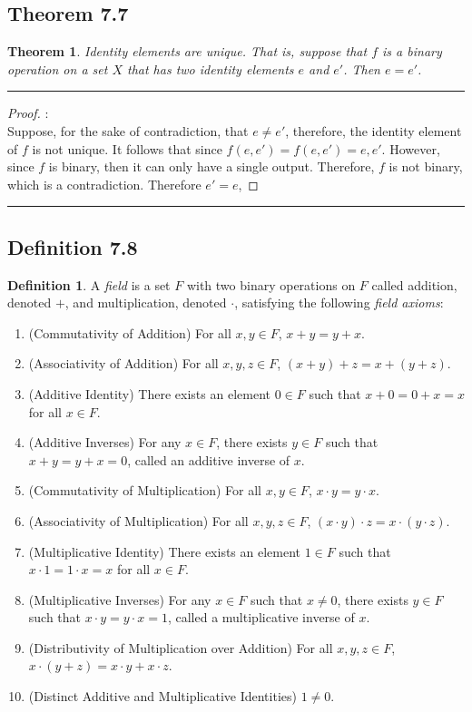 \documentclass[openany, amssymb, psamsfonts]{amsart}
\newtheorem{thm}{Theorem}[section]
\theoremstyle{definition}
\newtheorem{defn}{Definition}[section]
\numberwithin{equation}{section}
\begin{document}
\subsection*{Theorem 7.7}
\label{7.7}
\begin{thm}
Identity elements are unique.  That is, suppose that $f$ is a binary operation on a set $X$ that has two identity elements $e$ and $e'$.  Then $e = e'$.
\end{thm}
        \vspace{4pt}     \hrule   \vspace{4pt} \begin{proof}:\\
Suppose, for the sake of contradiction, that $e \neq e'$, therefore, the identity element of $f$ is not unique. It follows that since $f(e,e') = f(e,e') = e,e'$. However, since $f$ is binary, then it can only have a single output. Therefore, $f$ is not binary, which is a contradiction. Therefore $e' = e$, 
\end{proof}		
\vspace{4pt}     \hrule   \vspace{4pt}
\subsection*{Definition 7.8}
\label{7.8}
\begin{defn}
	A \emph{field} is a set $F$ with two binary operations  on $F$ called addition, denoted $+$, and multiplication, denoted $\cdot$\;, satisfying the following \emph{field axioms}:
	\begin{enumerate}[{FA}1]
		\item  (Commutativity of Addition)  For all $x,y\in F$, $x + y = y + x$.
		\item  (Associativity of Addition)  For all $x,y,z\in F$, $(x + y) + z = x + (y + z)$.
		\item  (Additive Identity)  There exists an element $0 \in F$ such that $x + 0 = 0 + x = x$ for all $x \in F$.
		\item  (Additive Inverses)  For any $x \in F$, there exists $y \in F$ such that $x + y = y + x = 0$,  called an additive inverse of $x$.
		\item  (Commutativity of Multiplication)  For all $x,y\in F$, $x \cdot y = y \cdot x$.
		\item  (Associativity of Multiplication)  For all $x, y, z \in F$, $(x \cdot y) \cdot z = x \cdot (y \cdot z)$.
		\item  (Multiplicative Identity)  There exists an element $1 \in F$ such that $x \cdot 1 = 1 \cdot x = x$ for all $x \in F$.
		\item  (Multiplicative Inverses)  For any $x \in F$ such that $x \neq 0$, there exists $y \in F$ such that $x \cdot y = y \cdot x = 1$,  called a multiplicative inverse of $x$.
		\item  (Distributivity of Multiplication over Addition)  For all $x, y, z \in F$,
		$x \cdot(y + z) = x \cdot y + x \cdot z$. 
		\item  (Distinct Additive and Multiplicative Identities)  $1 \neq 0$.
\end{enumerate}

\end{defn}
\end{document}
